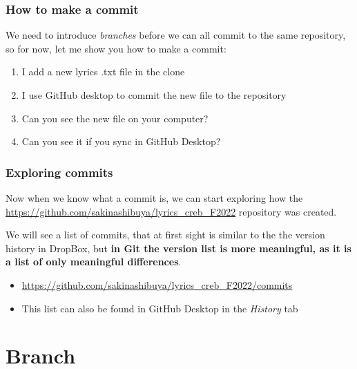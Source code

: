 \documentclass[aspectratio=169]{beamer} %
\newcommand{\trainingURL}[1]{{\color{blue}\url{#1}}}
\newcommand{\traininerUsername}{sakinashibuya}
\newcommand{\repoName}{\traininerUsername/lyrics_creb_F2022}
\newcommand{\trainingRepoURL}[1]{\trainingURL{https://github.com/\repoName #1}}
\begin{document}
\begin{frame}
\frametitle{How to make a commit}

	We need to introduce \textit{branches} before we can all commit to the same repository, so for now, let me show you how to make a commit:

	\begin{enumerate}
		\item I add a new lyrics .txt file in the clone
		\item I use GitHub desktop to commit the new file to the repository
		\item Can you see the new file on your computer?
		\item Can you see it if you sync in GitHub Desktop?
	\end{enumerate}

\end{frame}


\begin{frame}
\frametitle{Exploring commits}

	Now when we know what a commit is, we can start exploring how the \trainingRepoURL{} repository was created.

	\vspace{.25cm}

	We will see a list of commits, that at first sight is similar to the the version history in DropBox, but \textbf{in Git the version list is more meaningful, as it is a list of only meaningful differences}.

	\vspace{.25cm}

	\begin{itemize}
		\item \trainingRepoURL{/commits}
		\item This list can also be found in GitHub Desktop in the \textit{History} tab
	\end{itemize}

\end{frame}

\section{Branch}
\end{document}

